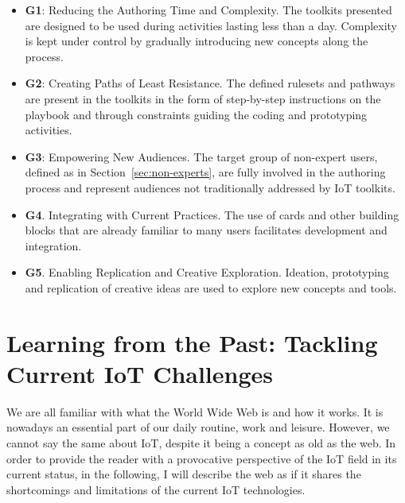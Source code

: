 \begin{itemize}
    \item \textbf{G1}: Reducing the Authoring Time and Complexity. The toolkits presented are designed to be used during activities lasting less than a day. Complexity is kept under control by gradually introducing new concepts along the process.
    \item \textbf{G2}: Creating Paths of Least Resistance. The defined rulesets and pathways are present in the toolkits in the form of step-by-step instructions on the playbook and through constraints guiding the coding and prototyping activities.
    \item \textbf{G3}: Empowering New Audiences. The target group of non-expert users, defined as in Section~\ref{sec:non-experts}, are fully involved in the authoring process and represent audiences not traditionally addressed by IoT toolkits.
    \item \textbf{G4}. Integrating with Current Practices. The use of cards and other building blocks that are already familiar to many users facilitates development and integration.
    \item \textbf{G5}. Enabling Replication and Creative Exploration. Ideation, prototyping and replication of creative ideas are used to explore new concepts and tools.
\end{itemize}


\section{Learning from the Past: Tackling Current IoT Challenges}

We are all familiar with what the World Wide Web is and how it works. It is nowadays an essential part of our daily routine, work and leisure. However, we cannot say the same about IoT, despite it being a concept as old as the web. In order to provide the reader with a provocative perspective of the IoT field in its current status, in the following, I will describe the web as if it shares the shortcomings and limitations of the current IoT technologies.

